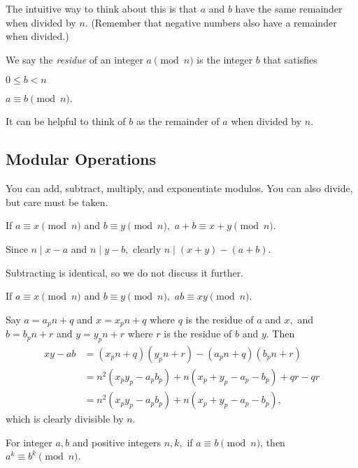 \documentclass{article}
\begin{document}
The intuitive way to think about this is that $a$ and $b$ have the same remainder when divided by $n.$ (Remember that negative numbers also have a remainder when divided.)

\begin{defi}
We say the \textit{residue} of an integer $a\pmod{n}$ is the integer $b$ that satisfies
\begin{itemize}
    \Item $0\leq b<n$
    
    \Item $a\equiv b\pmod{n}.$
\end{itemize}
\end{defi}

It can be helpful to think of $b$ as the remainder of $a$ when divided by $n.$

\subsection{Modular Operations}
You can add, subtract, multiply, and exponentiate modulos. You can also divide, but care must be taken.

\begin{fact}[Adding]
If $a \equiv x\pmod{n}$ and $b\equiv y\pmod{n},$ $a+b\equiv x+y\pmod{n}.$
\end{fact}

\begin{pro}
Since $n\mid x-a$ and $n\mid y-b,$ clearly $n\mid(x+y)-(a+b).$
\end{pro}

Subtracting is identical, so we do not discuss it further.

\begin{fact}[Multiplying]
If $a \equiv x\pmod{n}$ and $b\equiv y\pmod{n},$ $ab\equiv xy\pmod{n}.$
\end{fact}

\begin{pro}
Say $a=a_pn+q$ and $x=x_pn+q$ where $q$ is the residue of $a$ and $x,$ and $b=b_pn+r$ and $y=y_pn+r$ where $r$ is the residue of $b$ and $y.$ Then
\begin{align*}
xy-ab&=(x_pn+q)(y_pn+r)-(a_pn+q)(b_pn+r)\\
&=n^2(x_py_p-a_pb_p)+n(x_p+y_p-a_p-b_p)+qr-qr\\
&=n^2(x_py_p-a_pb_p)+n(x_p+y_p-a_p-b_p),
\end{align*}
which is clearly divisible by $n.$
\end{pro}

\begin{fact}[Exponentiating]
For integer $a,b$ and positive integers $n,k,$ if $a \equiv b\pmod{n}$, then $a^k \equiv b^k \pmod{n}$.
\end{fact}
\end{document}
